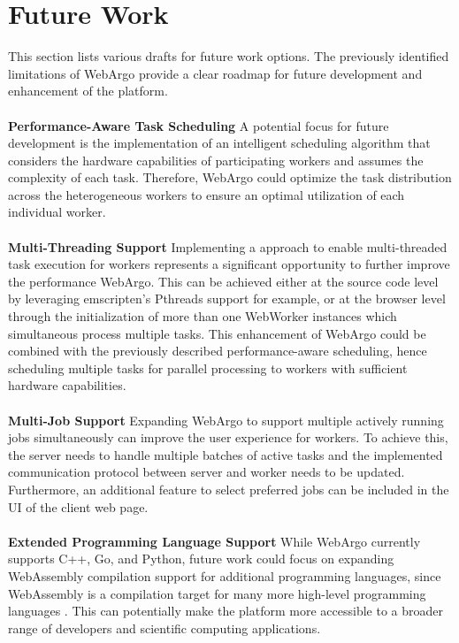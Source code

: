 \section{Future Work}
\label{sec:conclusion:future_work}
This section lists various drafts for future work options. The previously identified limitations of WebArgo provide a clear roadmap for future development and enhancement of the platform.  
\\~\\
\textbf{Performance-Aware Task Scheduling}
\newline
A potential focus for future development is the implementation of an intelligent scheduling algorithm that considers the hardware capabilities of participating workers and assumes the complexity of each task. Therefore, WebArgo could optimize the task distribution across the heterogeneous workers to ensure an optimal utilization of each individual worker.
\\~\\
\textbf{Multi-Threading Support}
\newline
Implementing a approach to enable multi-threaded task execution for workers represents a significant opportunity to further improve the performance WebArgo. This can be achieved either at the source code level by leveraging emscripten's Pthreads support \cite{methodology:emcc} for example, or at the browser level through the initialization of more than one WebWorker instances which simultaneous process multiple tasks. This enhancement of WebArgo could be combined with the previously described performance-aware scheduling, hence scheduling multiple tasks for parallel processing to workers with sufficient hardware capabilities.
\\~\\
\textbf{Multi-Job Support}
\newline
Expanding WebArgo to support multiple actively running jobs simultaneously can improve the user experience for workers. To achieve this, the server needs to handle multiple batches of active tasks and the implemented communication protocol between server and worker needs to be updated. Furthermore, an additional feature to select preferred jobs can be included in the \ac{UI} of the client web page.  
\\~\\
\textbf{Extended Programming Language Support}
\newline
While WebArgo currently supports C++, Go, and Python, future work could focus on expanding WebAssembly compilation support for additional programming languages, since WebAssembly is a compilation target for many more high-level programming languages \cite{methodology:wasm, methodology:wasmW3C, methodology:wasm2}. This can potentially make the platform more accessible to a broader range of developers and scientific computing applications.

